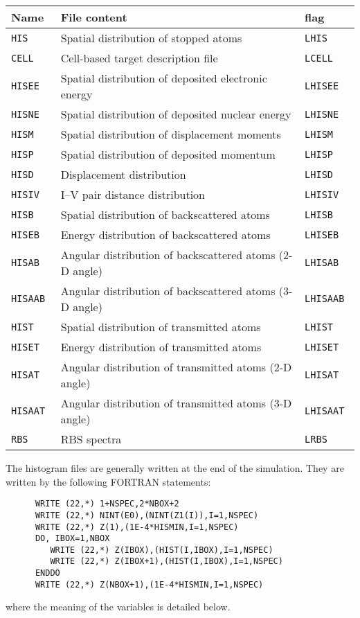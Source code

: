 \begin{center}
\begin{tabular}{|l|p{}|l|}
\hline
Name       & File content                                           & flag \\
\hline
\tt HIS    & Spatial distribution of stopped atoms                  & \tt LHIS \\
\tt CELL   & Cell-based target description file                     & \tt LCELL \\
\tt HISEE  & Spatial distribution of deposited electronic energy    & \tt LHISEE \\
\tt HISNE  & Spatial distribution of deposited nuclear energy       & \tt LHISNE \\
\tt HISM   & Spatial distribution of displacement moments           & \tt LHISM \\
\tt HISP   & Spatial distribution of deposited momentum             & \tt LHISP \\
\tt HISD   & Displacement distribution                              & \tt LHISD \\
\tt HISIV  & I--V pair distance distribution                        & \tt LHISIV \\
\tt HISB   & Spatial distribution of backscattered atoms            & \tt LHISB \\
\tt HISEB  & Energy distribution of backscattered atoms             & \tt LHISEB \\
\tt HISAB  & Angular distribution of backscattered atoms (2-D angle)& \tt LHISAB \\
\tt HISAAB & Angular distribution of backscattered atoms (3-D angle)& \tt LHISAAB \\
\tt HIST   & Spatial distribution of transmitted atoms              & \tt LHIST \\
\tt HISET  & Energy distribution of transmitted atoms               & \tt LHISET \\
\tt HISAT  & Angular distribution of transmitted atoms (2-D angle)  & \tt LHISAT \\
\tt HISAAT & Angular distribution of transmitted atoms (3-D angle)  & \tt LHISAAT \\
\tt RBS    & RBS spectra                                            & \tt LRBS \\
\hline
\end{tabular}
\end{center}

\bigskip

The histogram files are generally written at the end of the simulation. They are
written by the following FORTRAN statements:
%
\begin{verbatim}
      WRITE (22,*) 1+NSPEC,2*NBOX+2
      WRITE (22,*) NINT(E0),(NINT(Z1(I)),I=1,NSPEC)
      WRITE (22,*) Z(1),(1E-4*HISMIN,I=1,NSPEC)
      DO, IBOX=1,NBOX
         WRITE (22,*) Z(IBOX),(HIST(I,IBOX),I=1,NSPEC)
         WRITE (22,*) Z(IBOX+1),(HIST(I,IBOX),I=1,NSPEC)
      ENDDO
      WRITE (22,*) Z(NBOX+1),(1E-4*HISMIN,I=1,NSPEC)
\end{verbatim}
%
where the meaning of the variables is detailed below.

